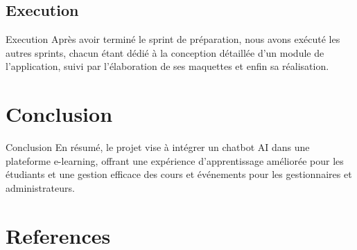 \documentclass{beamer}
\begin{document}
\subsection{Execution}
\begin{frame}{Execution}
    Après avoir terminé le sprint de préparation, nous avons exécuté les autres sprints, chacun étant dédié à la conception détaillée d’un module de l’application, suivi par l’élaboration de ses maquettes et enfin sa réalisation.
\end{frame}

\section{Conclusion}

\begin{frame}{Conclusion}
    En résumé, le projet vise à intégrer un chatbot AI dans une plateforme e-learning, offrant une expérience d’apprentissage améliorée pour les étudiants et une gestion efficace des cours et événements pour les gestionnaires et administrateurs.
\end{frame}

\section{References}

\begin{frame}[allowframebreaks]
    
    
\end{frame}
\end{document}
